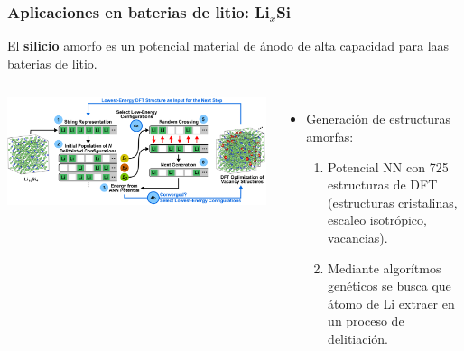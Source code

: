 \documentclass[aspectratio=169]{beamer}
\let\oldtextbf\textbf
\renewcommand{\textbf}[1]{\textcolor{nordblue}{\oldtextbf{#1}}}
\begin{document}
    \begin{frame}
        \frametitle{Aplicaciones en baterias de litio: Li$_x$Si}
        
        El \textbf{silicio} amorfo es un potencial material de ánodo de alta
        capacidad para laas baterias de litio.
        
        \begin{columns}
            \begin{center}
                \includegraphics[width=\columnwidth]{LiSi-metodo.png}
            \end{center}

            \begin{itemize}
                \item Generación de estructuras amorfas:
                    \begin{enumerate}
                        \item Potencial NN con 725 estructuras de DFT (estructuras
                            cristalinas, escaleo isotrópico, vacancias).
                        \item Mediante algorítmos genéticos se busca que átomo 
                            de Li extraer en un proceso de delitiación.
                    \end{enumerate}
            \end{itemize}
        \end{columns}
            
    \end{frame}
    
\end{document}
